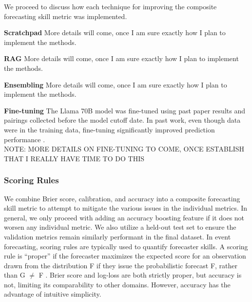 \documentclass[12pt,a4paper]{article}
\begin{document}
We proceed to discuss how each technique for improving the composite forecasting skill metric was implemented.

\textbf{Scratchpad}
More details will come, once I am sure exactly how I plan to implement the methods. %

\textbf{RAG}
More details will come, once I am sure exactly how I plan to implement the methods. %

\textbf{Ensembling}
More details will come, once I am sure exactly how I plan to implement the methods. %

\textbf{Fine-tuning}
The Llama 70B model was fine-tuned using past paper results and pairings collected before the model cutoff date. In past work, even though data were in the training data, fine-tuning significantly improved prediction performance . \\


NOTE: MORE DETAILS ON FINE-TUNING TO COME, ONCE ESTABLISH THAT I REALLY HAVE TIME TO DO THIS %

\textbf{}

\subsubsection{Scoring Rules} \label{sub:scoringrules}

We combine Brier score, calibration, and accuracy into a composite forecasting skill metric to attempt to mitigate the various issues in the individual metrics. In general, we only proceed with adding an accuracy boosting feature if it does not worsen any individual metric. We also utilize a held-out test set to ensure the validation metrics remain similarly performant in the final dataset. In event forecasting, scoring rules are typically used to quantify forecaster skills. A scoring rule is ``proper'' if the forecaster maximizes the expected score for an observation drawn from the distribution F if they issue the probabilistic forecast F, rather than G $\neq$ F . Brier score and log-loss are both strictly proper, but accuracy is not, limiting its comparability to other domains. However, accuracy has the advantage of intuitive simplicity.
\end{document}

